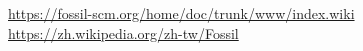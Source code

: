\renewcommand\bibname{參考文獻}
\begin{thebibliography}{99}
\href{https://fossil-scm.org/home/doc/trunk/www/index.wiki}{https://fossil-scm.org/home/doc/trunk/www/index.wiki}
\href{https://zh.wikipedia.org/zh-tw/Fossil}{https://zh.wikipedia.org/zh-tw/Fossil}
\end{thebibliography}
\par